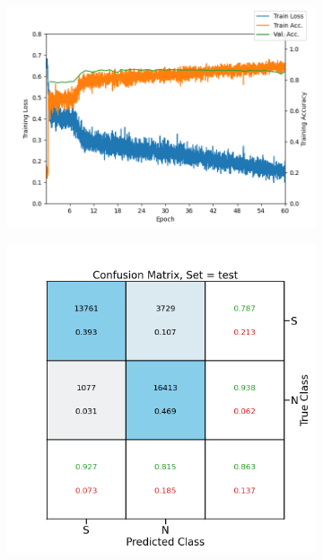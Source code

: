 \begin{figure}[htbp]
    \centering
    \begin{subfigure}{0.55\textwidth}
        \includegraphics*[width=\textwidth]{figs/Chapter-4/210604_training_info_dset_name210602_df1_ch3_temp10.0_modeldf_conv6_fc2_3ch_domain_freq.png}
        \caption{}
    \end{subfigure}
    \begin{subfigure}{0.4\textwidth}
        \includegraphics*[width=\textwidth]{figs/Chapter-4/210604_test_confusion_matrix_train_dset_210602_df1_ch3_test_dset_210602_df2_test_ch3_model_df_conv6_fc2_3ch_domain_freq_epoch_48.png}
        \caption{}
    \end{subfigure}
    \caption{}
\end{figure}

